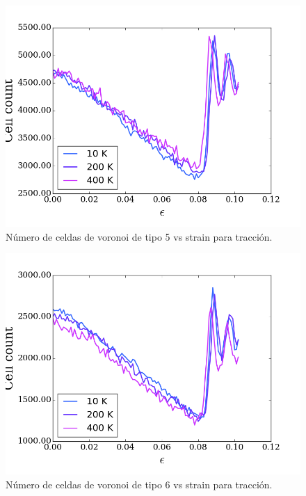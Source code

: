 \documentclass[10pt, oneside]{article} %
\begin{document}
\begin{figure}[H]
\centering
\includegraphics[width=15cm]{Figures/NanoParticles/voro_type5_tension.png}
\caption{Número de celdas de voronoi de tipo 5 vs strain para tracción.}
\end{figure}

\begin{figure}[H]
\centering
\includegraphics[width=15cm]{Figures/NanoParticles/voro_type6_tension.png}
\caption{Número de celdas de voronoi de tipo 6 vs strain para tracción.}
\end{figure}
\end{document}
